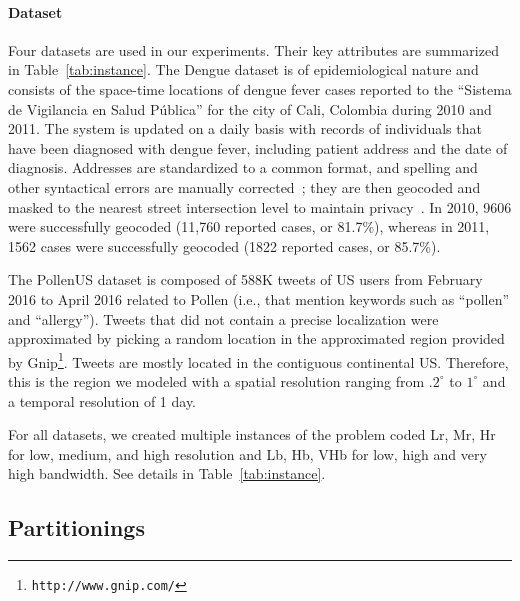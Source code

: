 \documentclass[10pt, conference, compsocconf]{IEEEtran}
\begin{document}
\paragraph{Dataset} Four datasets are used in our experiments. Their
key attributes are summarized in Table~\ref{tab:instance}. 
The Dengue dataset is of epidemiological nature and consists of the space-time
locations of dengue fever cases reported to the “Sistema de Vigilancia
en Salud P\'{u}blica” for the city of Cali, Colombia during 2010 and 2011. The
system is updated on a daily basis with records of individuals that
have been diagnosed with dengue fever, including patient address and
the date of diagnosis. Addresses are standardized to a common 
format, and spelling and other syntactical errors are manually
corrected~\cite{delmelle2013spatio}; they are then geocoded and masked
to the nearest street intersection level to maintain
privacy~\cite{Kwan04}. In 2010, 9606 were successfully geocoded
(11,760 reported cases, or 81.7\%), whereas in 2011, 1562 cases were
successfully geocoded (1822 reported cases, or 85.7\%).

The PollenUS dataset is composed of 588K tweets of US users from
February 2016 to April 2016 related to Pollen (i.e., that mention
keywords such as ``pollen'' and ``allergy''). Tweets that did not
contain a precise localization were approximated by picking a random
location in the approximated region provided by
Gnip\footnote{\texttt{http://www.gnip.com/}}. Tweets are mostly located
in the contiguous continental US. Therefore, this is the region we
modeled with a spatial resolution ranging from $.2^\circ$ to $1^\circ$
and a temporal resolution of 1 day.

For all datasets, we created multiple instances of the problem coded
Lr, Mr, Hr for low, medium, and high resolution and Lb, Hb, VHb for
low, high and very high bandwidth. See details in Table~\ref{tab:instance}. 

\begin{table}
  \centering
    \resizebox{.9\linewidth}{!}{}
  \caption{Properties of the datasets. The domain is expressed in voxels
    and in MB. Bandwidth are expressed in voxels.}
  \label{tab:instance}
\end{table}

\subsection{Partitionings}
\end{document}
